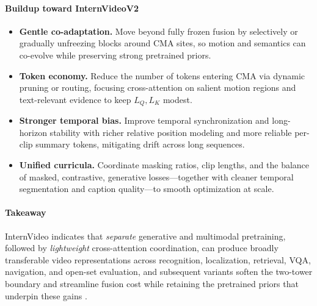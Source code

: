 \begin{enrichment}
\begin{enrichment}
        \paragraph{Buildup toward InternVideoV2}
        \begin{itemize}
            \item \textbf{Gentle co-adaptation.} Move beyond fully frozen fusion by selectively or gradually unfreezing blocks around CMA sites, so motion and semantics can co-evolve while preserving strong pretrained priors. 
            \item \textbf{Token economy.} Reduce the number of tokens entering CMA via dynamic pruning or routing, focusing cross-attention on salient motion regions and text-relevant evidence to keep \(L_Q,L_K\) modest. 
            \item \textbf{Stronger temporal bias.} Improve temporal synchronization and long-horizon stability with richer relative position modeling and more reliable per-clip summary tokens, mitigating drift across long sequences. 
            \item \textbf{Unified curricula.} Coordinate masking ratios, clip lengths, and the balance of masked, contrastive, generative losses—together with cleaner temporal segmentation and caption quality—to smooth optimization at scale. 
        \end{itemize}
        
        \paragraph{Takeaway}
        InternVideo indicates that \emph{separate} generative and multimodal pretraining, followed by \emph{lightweight} cross-attention coordination, can produce broadly transferable video representations across recognition, localization, retrieval, VQA, navigation, and open-set evaluation, and subsequent variants soften the two-tower boundary and streamline fusion cost while retaining the pretrained priors that underpin these gains \cite{wang2022_internvideo}.
        
    \end{enrichment}
    
    \newpage
    
    \begin{enrichment}
        \label{enr:subsec_chapter24_omnivl}
        

\end{enrichment}
\end{enrichment}

